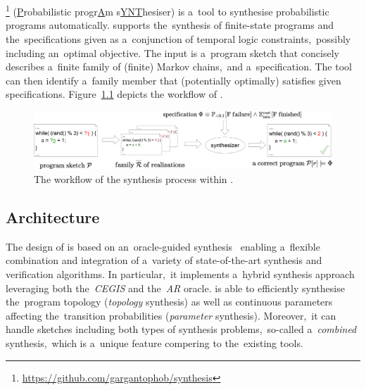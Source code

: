 \chapter{\toolname{}}\label{chap:paynt}

\toolname{}\footnote{\url{https://github.com/gargantophob/synthesis}} (\underline{P}robabilistic progr\underline{A}m s\underline{YNT}hesiser) is a~tool to synthesise probabilistic programs automatically.
\toolname{} supports the~synthesis of finite-state programs and the~specifications given as a~conjunction of temporal logic constraints,~possibly including an~optimal objective.
The input is a~program sketch that concisely describes a~finite family of (finite) Markov chains,~and a~specification.
The tool can then identify a~family member that (potentially optimally) satisfies given specifications.
Figure~\ref{fig:sketching} depicts the workflow of \toolname{}.

\begin{figure}[h!]
\centering
\includegraphics[width=1.0\textwidth]{figures/sketching}
\caption{The workflow of the synthesis process within \toolname{}.}%
\label{fig:sketching}%
\end{figure}

\section{Architecture}

The design of \toolname{} is based on an~oracle-guided synthesis~\cite{tacas21} enabling a~flexible combination and integration of a~variety of state-of-the-art synthesis and verification algorithms. 
In particular,~it implements a~hybrid synthesis approach leveraging both the~\emph{CEGIS} and the~\emph{AR} oracle. 
\toolname{} is able to efficiently synthesise the~program topology (\emph{topology} synthesis) as well as continuous parameters affecting the~transition probabilities (\emph{parameter} synthesis).
Moreover,~it can handle sketches including both types of synthesis problems,~so-called a~\emph{combined} synthesis,~which is a~unique feature compering to the~existing tools. 

